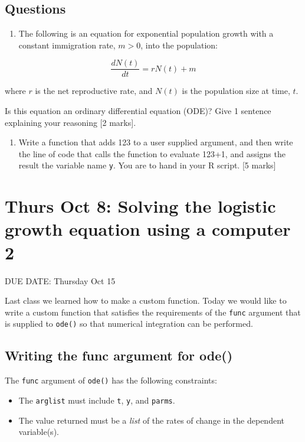 \documentclass[]{book}
\providecommand{\tightlist}{%
  \setlength{\itemsep}{0pt}\setlength{\parskip}{0pt}}
\begin{document}
\section{Questions}\label{questions}

\begin{enumerate}
\def\labelenumi{\arabic{enumi}.}
\tightlist
\item
  The following is an equation for exponential population growth with a
  constant immigration rate, \(m>0\), into the population:
\end{enumerate}

\[
\frac{dN(t)}{dt}= rN(t) + m
\]

where \(r\) is the net reproductive rate, and \(N(t)\) is the population
size at time, \(t\).

Is this equation an ordinary differential equation (ODE)? Give 1
sentence explaining your reasoning {[}2 marks{]}.

\begin{enumerate}
\def\labelenumi{\arabic{enumi}.}
\setcounter{enumi}{1}
\tightlist
\item
  Write a function that adds 123 to a user supplied argument, and then
  write the line of code that calls the function to evaluate 123+1, and
  assigns the result the variable name \texttt{y}. You are to hand in
  your R script. {[}5 marks{]}
\end{enumerate}

\chapter{Thurs Oct 8: Solving the logistic growth equation using a
computer 2}\label{NumSolve2}

DUE DATE: Thursday Oct 15

Last class we learned how to make a custom function. Today we would like
to write a custom function that satisfies the requirements of the
\texttt{func} argument that is supplied to \texttt{ode()} so that
numerical integration can be performed.

\section{Writing the func argument for
ode()}\label{writing-the-func-argument-for-ode}

The \texttt{func} argument of \texttt{ode()} has the following
constraints:

\begin{itemize}
\tightlist
\item
  The \texttt{arglist} must include \texttt{t}, \texttt{y}, and
  \texttt{parms}.
\item
  The value returned must be a \emph{list} of the rates of change in the
  dependent variable(s).
\end{itemize}
\end{document}
